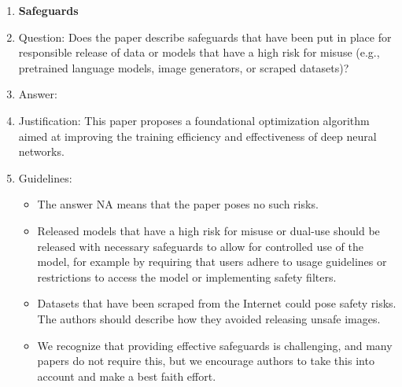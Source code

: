 \documentclass{article}
\theoremstyle{remark}
\begin{document}
\begin{enumerate}
\item {\bf Safeguards}
    \item[] Question: Does the paper describe safeguards that have been put in place for responsible release of data or models that have a high risk for misuse (e.g., pretrained language models, image generators, or scraped datasets)?
    \item[] Answer: \answerNA{} %
    \item[] Justification: This paper proposes a foundational optimization algorithm aimed at improving the training efficiency and effectiveness of deep neural networks.
    \item[] Guidelines:
    \begin{itemize}
        \item The answer NA means that the paper poses no such risks.
        \item Released models that have a high risk for misuse or dual-use should be released with necessary safeguards to allow for controlled use of the model, for example by requiring that users adhere to usage guidelines or restrictions to access the model or implementing safety filters. 
        \item Datasets that have been scraped from the Internet could pose safety risks. The authors should describe how they avoided releasing unsafe images.
        \item We recognize that providing effective safeguards is challenging, and many papers do not require this, but we encourage authors to take this into account and make a best faith effort.
    \end{itemize}


\end{enumerate}
\end{document}
